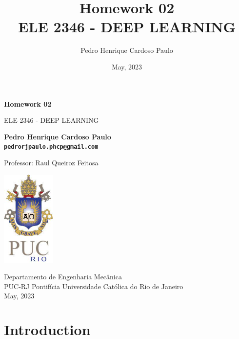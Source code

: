 \documentclass[10pt, a4paper]{article}
\begin{document}
\def\TITLE{Homework 02}
\def\DISCIPLINE{ELE 2346 - DEEP LEARNING}
\def\PROFESSOR{Raul Queiroz Feitosa}
\def\AUTHOR{Pedro Henrique Cardoso Paulo}
\def\CONTACT{pedrorjpaulo.phcp@gmail.com}
\def\DATE{May, 2023}

\title{\textbf{\TITLE} \\ \DISCIPLINE}
\author{\AUTHOR}
\date{\DATE}

\begin{titlepage}
      \begin{center}
          \vspace*{1cm}

          \Huge
          \textbf{\TITLE}

          \vspace{0.5cm}
          \LARGE
          \DISCIPLINE

          \vspace{1.5cm}

          \textbf{\AUTHOR \\ {\tt \CONTACT}}

          \vfill
          Professor: \PROFESSOR

          \vspace{0.8cm}

          \includegraphics[width=0.2\textwidth]{../general/puc.jpg}

          \Large
          Departamento de Engenharia Mecânica\\
          PUC-RJ Pontifícia Universidade Católica do Rio de Janeiro\\
          \DATE

      \end{center}
  \end{titlepage}

\maketitle

\section{Introduction}
\end{document}
